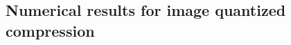 \documentclass[lettersize,journal]{IEEEtran}
\begin{document}




\subsection{Numerical results for image quantized compression}
\end{document}
